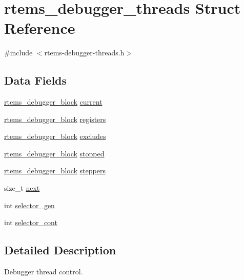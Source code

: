 \hypertarget{structrtems__debugger__threads}{}\section{rtems\+\_\+debugger\+\_\+threads Struct Reference}
\label{structrtems__debugger__threads}


{\ttfamily \#include $<$rtems-\/debugger-\/threads.\+h$>$}

\subsection*{Data Fields}
\begin{DoxyCompactItemize}
\item 
\mbox{\hyperlink{structrtems__debugger__block}{rtems\+\_\+debugger\+\_\+block}} \mbox{\hyperlink{structrtems__debugger__threads_af37e98c72519a8831db098a6ec536ac4}{current}}
\item 
\mbox{\hyperlink{structrtems__debugger__block}{rtems\+\_\+debugger\+\_\+block}} \mbox{\hyperlink{structrtems__debugger__threads_abbbc5457e1410d9152cfaa1a9d8a7ce0}{registers}}
\item 
\mbox{\hyperlink{structrtems__debugger__block}{rtems\+\_\+debugger\+\_\+block}} \mbox{\hyperlink{structrtems__debugger__threads_af232990da62f0b6f93056b2b5cc3487b}{excludes}}
\item 
\mbox{\hyperlink{structrtems__debugger__block}{rtems\+\_\+debugger\+\_\+block}} \mbox{\hyperlink{structrtems__debugger__threads_a1a75ac94c2918858b6aea324eb5a690f}{stopped}}
\item 
\mbox{\hyperlink{structrtems__debugger__block}{rtems\+\_\+debugger\+\_\+block}} \mbox{\hyperlink{structrtems__debugger__threads_adccf1a9b5e385004358e2510bbbbdf5f}{steppers}}
\item 
size\+\_\+t \mbox{\hyperlink{structrtems__debugger__threads_ab2d94e359b7890f0fc4175d4b8021165}{next}}
\item 
int \mbox{\hyperlink{structrtems__debugger__threads_afdb57c30e1fe1b5d37ca65aab2325c52}{selector\+\_\+gen}}
\item 
int \mbox{\hyperlink{structrtems__debugger__threads_a894f409ea3bb363fcd0120c6e87df4d1}{selector\+\_\+cont}}
\end{DoxyCompactItemize}


\subsection{Detailed Description}
Debugger thread control. 

